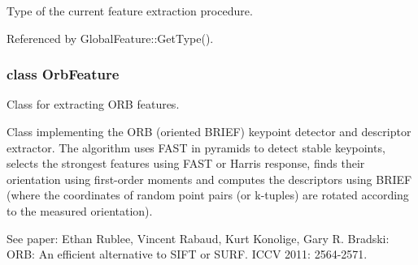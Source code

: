 Type of the current feature extraction procedure. 



Referenced by Global\-Feature\-::\-Get\-Type().

\label{class_orb_feature}
\hypertarget{group___feature_extractor_class_orb_feature}{}
\subsubsection{class Orb\-Feature}
Class for extracting O\-R\-B features. 

Class implementing the O\-R\-B (oriented B\-R\-I\-E\-F) keypoint detector and descriptor extractor. The algorithm uses F\-A\-S\-T in pyramids to detect stable keypoints, selects the strongest features using F\-A\-S\-T or Harris response, finds their orientation using first-\/order moments and computes the descriptors using B\-R\-I\-E\-F (where the coordinates of random point pairs (or k-\/tuples) are rotated according to the measured orientation).

See paper\-: Ethan Rublee, Vincent Rabaud, Kurt Konolige, Gary R. Bradski\-: O\-R\-B\-: An efficient alternative to S\-I\-F\-T or S\-U\-R\-F. I\-C\-C\-V 2011\-: 2564-\/2571. 

